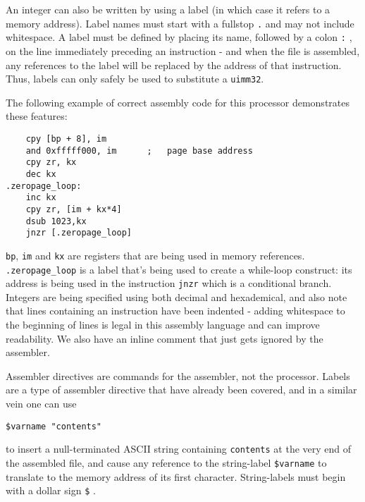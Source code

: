 \documentclass[12pt,a4paper]{report}
\begin{document}
An integer can also be written by using a label (in which case it refers to a memory address). Label names must start with a fullstop \texttt{.} and may not include whitespace. A label must be defined by placing its name, followed by a colon \texttt{:} , on the line immediately preceding an instruction - and when the file is assembled, any references to the label will be replaced by the address of that instruction. Thus, labels can only safely be used to substitute a \texttt{uimm32}.

The following example of correct assembly code for this processor demonstrates these features:
\begin{verbatim}
    cpy [bp + 8], im
    and 0xfffff000, im      ;   page base address
    cpy zr, kx
    dec kx
.zeropage_loop:
    inc kx
    cpy zr, [im + kx*4]
    dsub 1023,kx
    jnzr [.zeropage_loop]
\end{verbatim}

\texttt{bp}, \texttt{im} and \texttt{kx} are registers that are being used in memory references. \texttt{.zeropage\_loop} is a label that's being used to create a while-loop construct: its address is being used in the instruction \texttt{jnzr} which is a conditional branch. Integers are being specified using both decimal and hexademical, and also note that lines containing an instruction have been indented - adding whitespace to the beginning of lines is legal in this assembly language and can improve readability. We also have an inline comment that just gets ignored by the assembler.

Assembler directives are commands for the assembler, not the processor. Labels are a type of assembler directive that have already been covered, and in a similar vein one can use
\begin{verbatim}
$varname "contents"
\end{verbatim}
to insert a null-terminated ASCII string containing \texttt{contents} at the very end of the assembled file, and cause any reference to the string-label \texttt{\$varname} to translate to the memory address of its first character. String-labels must begin with a dollar sign \texttt{\$} .
\end{document}
